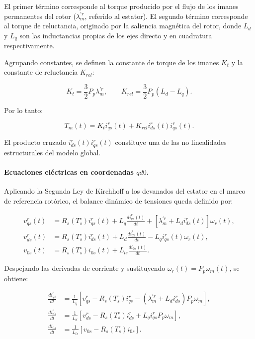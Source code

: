 \documentclass[10pt,a4paper]{article}
\begin{document}
El primer término corresponde al torque producido por el flujo de los imanes permanentes del rotor ($\lambda_m^{\prime r}$, referido al estator). El segundo término corresponde al torque de reluctancia, originado por la saliencia magnética del rotor, donde $L_d$ y $L_q$ son las inductancias propias de los ejes directo y en cuadratura respectivamente.

Agrupando constantes, se definen la constante de torque de los imanes $K_t$ y la constante de reluctancia $K_{rel}$:

\begin{equation*}
	K_t = \frac{3}{2}P_p \lambda_m^{\prime r}, \qquad K_{rel} = \frac{3}{2}P_p \left(L_d - L_q\right).
\end{equation*}

Por lo tanto:

\begin{equation}
	T_m(t) = K_t i_{qs}^{r}(t) + K_{rel} i_{ds}^{r}(t)i_{qs}^{r}(t).
	\label{eq:torque_kt_krel}
\end{equation}

El producto cruzado $i_{ds}^{r}(t)i_{qs}^{r}(t)$ constituye una de las no linealidades estructurales del modelo global.

\paragraph{Ecuaciones eléctricas en coordenadas $qd0$.}
Aplicando la Segunda Ley de Kirchhoff a los devanados del estator en el marco de referencia rotórico, el balance dinámico de tensiones queda definido por:

\begin{equation}
	\begin{aligned}
		v_{qs}^{r}(t) &= R_s\left(T_s^{\circ}\right)i_{qs}^{r}(t) + L_q \frac{di_{qs}^{r}(t)}{dt} + \left[\lambda_m^{\prime r} + L_d i_{ds}^{r}(t)\right]\omega_r(t), \\
		v_{ds}^{r}(t) &= R_s\left(T_s^{\circ}\right)i_{ds}^{r}(t) + L_d \frac{di_{ds}^{r}(t)}{dt} - L_q i_{qs}^{r}(t)\omega_r(t), \\
		v_{0s}(t) &= R_s\left(T_s^{\circ}\right)i_{0s}(t) + L_{ls}\frac{di_{0s}(t)}{dt}.
	\end{aligned}
	\label{eq:dinamica_tensiones_qd0}
\end{equation}

Despejando las derivadas de corriente y sustituyendo $\omega_r(t)=P_p\omega_m(t)$, se obtiene:

\begin{equation}
	\begin{aligned}
		\frac{di_{qs}^{r}}{dt} &= \frac{1}{L_q}\left[v_{qs}^{r} - R_s\left(T_s^{\circ}\right)i_{qs}^{r} - \left(\lambda_m^{\prime r}+L_d i_{ds}^{r}\right)P_p\omega_m\right],\\
		\frac{di_{ds}^{r}}{dt} &= \frac{1}{L_d}\left[v_{ds}^{r} - R_s\left(T_s^{\circ}\right)i_{ds}^{r} + L_q i_{qs}^{r}P_p\omega_m\right],\\
		\frac{di_{0s}}{dt} &= \frac{1}{L_{ls}}\left[v_{0s} - R_s\left(T_s^{\circ}\right)i_{0s}\right].
	\end{aligned}
	\label{eq:dinamica_corrientes_qd0}
\end{equation}
\end{document}
